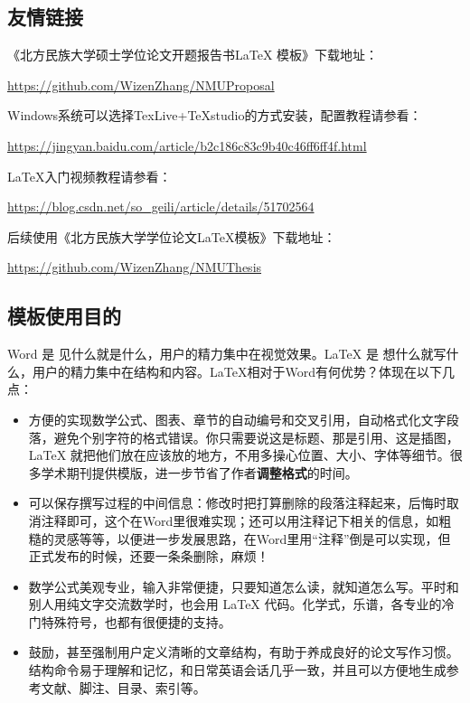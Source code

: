 \begin{framedbox}
\subsection{友情链接}

《北方民族大学硕士学位论文开题报告书\LaTeX{} 模板》下载地址：

\href{https://github.com/WizenZhang/NMUProposal}{https://github.com/WizenZhang/NMUProposal}

Windows系统可以选择TexLive+TeXstudio的方式安装，配置教程请参看：

\href{https://jingyan.baidu.com/article/b2c186c83c9b40c46ff6ff4f.html}{https://jingyan.baidu.com/article/b2c186c83c9b40c46ff6ff4f.html}


\LaTeX{}入门视频教程请参看：

\href{https://blog.csdn.net/so_geili/article/details/51702564}{https://blog.csdn.net/so\_geili/article/details/51702564}

后续使用《北方民族大学学位论文\LaTeX{}模板》下载地址：

\href{https://github.com/WizenZhang/NMUThesis}{https://github.com/WizenZhang/NMUThesis}


\newpage
\subsection{模板使用目的}

Word 是 见什么就是什么，用户的精力集中在视觉效果。\LaTeX{} 是 想什么就写什么，用户的精力集中在结构和内容。\LaTeX{}相对于Word有何优势？体现在以下几点：

\begin{itemize}[topsep=0pt,partopsep=0pt,itemsep=0pt,parsep=0pt]
\item 方便的实现数学公式、图表、章节的自动编号和交叉引用，自动格式化文字段落，避免个别字符的格式错误。你只需要说这是标题、那是引用、这是插图，\LaTeX{} 就把他们放在应该放的地方，不用多操心位置、大小、字体等细节。很多学术期刊提供模版，进一步节省了作者{\bfseries \songti 调整格式}的时间。
\item 可以保存撰写过程的中间信息：修改时把打算删除的段落注释起来，后悔时取消注释即可，这个在Word里很难实现；还可以用注释记下相关的信息，如粗糙的灵感等等，以便进一步发展思路，在Word里用“注释”倒是可以实现，但正式发布的时候，还要一条条删除，麻烦！
\item 数学公式美观专业，输入非常便捷，只要知道怎么读，就知道怎么写。平时和别人用纯文字交流数学时，也会用 \LaTeX{} 代码。化学式，乐谱，各专业的冷门特殊符号，也都有很便捷的支持。	
\item 鼓励，甚至强制用户定义清晰的文章结构，有助于养成良好的论文写作习惯。结构命令易于理解和记忆，和日常英语会话几乎一致，并且可以方便地生成参考文献、脚注、目录、索引等。	
\end{itemize}


\end{framedbox}
